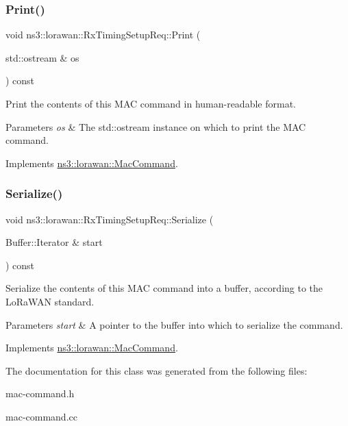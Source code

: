 \subsubsection{\texorpdfstring{Print()}{Print()}}
{\footnotesize\ttfamily void ns3\+::lorawan\+::\+Rx\+Timing\+Setup\+Req\+::\+Print (\begin{DoxyParamCaption}\item[{std\+::ostream \&}]{os }\end{DoxyParamCaption}) const\hspace{0.3cm}{\ttfamily [virtual]}}

Print the contents of this M\+AC command in human-\/readable format.


\begin{DoxyParams}{Parameters}
{\em os} & The std\+::ostream instance on which to print the M\+AC command. \\
\hline
\end{DoxyParams}


Implements \hyperlink{classns3_1_1lorawan_1_1MacCommand_a6bf88db38dab7dcd817811a9fb59f920}{ns3\+::lorawan\+::\+Mac\+Command}.

\mbox{\label{classns3_1_1lorawan_1_1RxTimingSetupReq_a9c19bbf820d8e943a8426d127f4fa3f6}} 
\subsubsection{\texorpdfstring{Serialize()}{Serialize()}}
{\footnotesize\ttfamily void ns3\+::lorawan\+::\+Rx\+Timing\+Setup\+Req\+::\+Serialize (\begin{DoxyParamCaption}\item[{Buffer\+::\+Iterator \&}]{start }\end{DoxyParamCaption}) const\hspace{0.3cm}{\ttfamily [virtual]}}

Serialize the contents of this M\+AC command into a buffer, according to the Lo\+Ra\+W\+AN standard.


\begin{DoxyParams}{Parameters}
{\em start} & A pointer to the buffer into which to serialize the command. \\
\hline
\end{DoxyParams}


Implements \hyperlink{classns3_1_1lorawan_1_1MacCommand_a0ed44b33942ddc3dc9694dc06ab0b87f}{ns3\+::lorawan\+::\+Mac\+Command}.



The documentation for this class was generated from the following files\+:\begin{DoxyCompactItemize}
\item 
mac-\/command.\+h\item 
mac-\/command.\+cc\end{DoxyCompactItemize}
